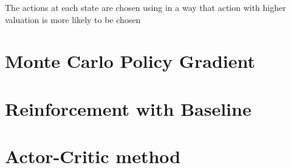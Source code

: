 \documentclass[a4paper,12pt]{article}  %
\theoremstyle{definition}
\begin{document}
	The actions at each state are chosen using in a way that action with higher valuation is more likely to be chosen
	
	\section{Monte Carlo Policy Gradient}
	
	\section{Reinforcement with Baseline}
	
	\section{Actor-Critic method}
		
	

	
	\small
	
	 
	
\end{document}
